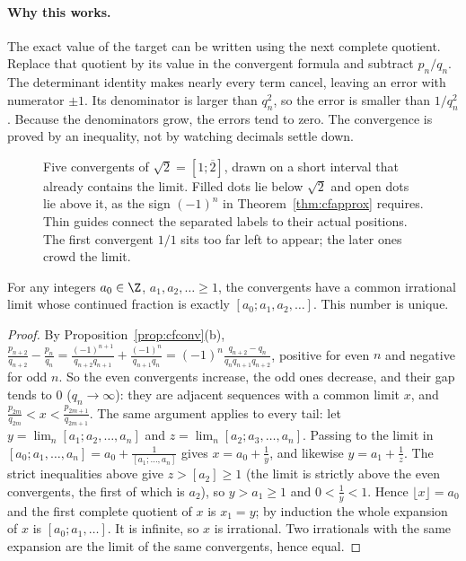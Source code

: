 \paragraph{Why this works.}
The exact value of the target can be written using the next complete quotient. Replace that quotient by its value in the convergent formula and subtract $p_n/q_n$. The determinant identity makes nearly every term cancel, leaving an error with numerator $\pm1$. Its denominator is larger than $q_n^2$, so the error is smaller than $1/q_n^2$. Because the denominators grow, the errors tend to zero. The convergence is proved by an inequality, not by watching decimals settle down.

\begin{figure}[ht]
\centering
{}
\caption{Five convergents of $\sqrt2=[1;\overline{2}]$, drawn on a short interval that already contains the limit. Filled dots lie below $\sqrt2$ and open dots lie above it, as the sign $(-1)^n$ in Theorem~\ref{thm:cfapprox} requires. Thin guides connect the separated labels to their actual positions. The first convergent $1/1$ sits too far left to appear; the later ones crowd the limit.}
\label{fig:cf-line}
\end{figure}

\begin{lemma}\label{lem:cfexistence}
For any integers $a_0\in\Z$, $a_1,a_2,\ldots\ge1$, the convergents
have a common irrational limit whose continued fraction is exactly
$[a_0;a_1,a_2,\ldots]$. This number is unique.
\end{lemma}
\begin{proof}
By Proposition~\ref{prop:cfconv}(b), $\frac{p_{n+2}}{q_{n+2}}-\frac{p_n}{q_n}=\frac{(-1)^{n+1}}{q_{n+2}q_{n+1}}+\frac{(-1)^n}{q_{n+1}q_n}=(-1)^n\frac{q_{n+2}-q_n}{q_nq_{n+1}q_{n+2}}$, positive for even $n$ and negative for odd $n$. So the even convergents increase, the odd ones decrease, and their gap tends to $0$ ($q_n\to\infty$): they are adjacent sequences with a common limit $x$, and $\frac{p_{2m}}{q_{2m}}<x<\frac{p_{2m+1}}{q_{2m+1}}$. The same argument applies to every tail: let $y=\lim_n[a_1;a_2,\dots,a_n]$ and $z=\lim_n[a_2;a_3,\dots,a_n]$. Passing to the limit in $[a_0;a_1,\dots,a_n]=a_0+\frac1{[a_1;\dots,a_n]}$ gives $x=a_0+\frac1y$, and likewise $y=a_1+\frac1z$. The strict inequalities above give $z>[a_2]\ge1$ (the limit is strictly above the even convergents, the first of which is $a_2$), so $y>a_1\ge1$ and $0<\frac1y<1$. Hence $\lfloor x\rfloor=a_0$ and the first complete quotient of $x$ is $x_1=y$; by induction the whole expansion of $x$ is $[a_0;a_1,\dots]$. It is infinite, so $x$ is irrational. Two irrationals with the same expansion are the limit of the same convergents, hence equal.
\end{proof}

